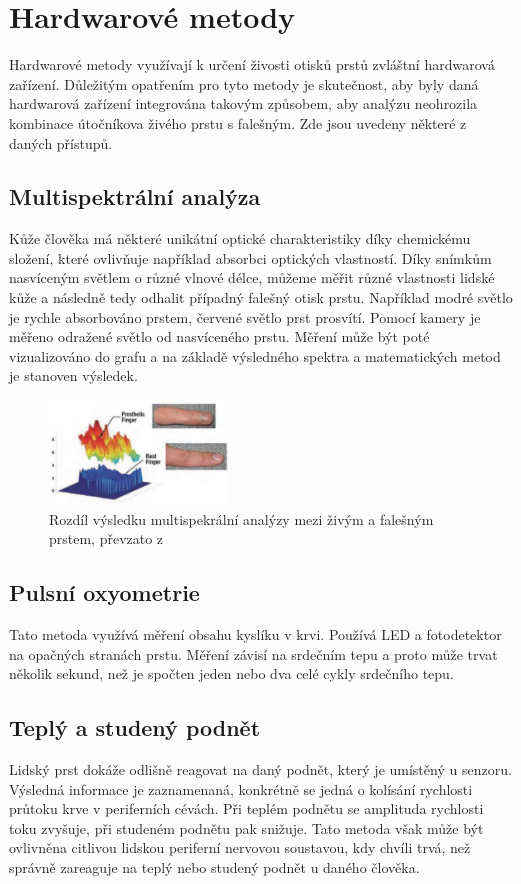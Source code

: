 \section{Hardwarové metody}
Hardwarové metody využívají k určení živosti otisků prstů zvláštní hardwarová zařízení. Důležitým opatřením pro tyto metody je skutečnost, aby byly daná hardwarová zařízení integrována takovým způsobem, aby analýzu neohrozila kombinace útočníkova živého prstu s falešným. Zde jsou uvedeny některé z daných přístupů.
\subsection{Multispektrální analýza}
Kůže člověka má některé unikátní optické charakteristiky díky chemickému složení, které ovlivňuje například absorbci optických vlastností. Díky snímkům nasvíceným světlem o různé vlnové délce, můžeme měřit různé vlastnosti lidské kůže a následně tedy odhalit případný falešný otisk prstu. Například modré světlo je rychle absorbováno prstem, červené světlo prst prosvítí. Pomocí kamery je měřeno odražené světlo od nasvíceného prstu. Měření může být poté vizualizováno do grafu a na základě výsledného spektra a matematických metod je stanoven výsledek. \cite{AdvancedBiometricsTechnologies2011}

\begin{figure}[!htbp]
    \centering
    \includegraphics[width=180px]{obrazky-figures/multispectralAnalysis.PNG}
    \caption{Rozdíl výsledku multispekrální analýzy mezi živým a falešným prstem, převzato z \cite{AdvancedBiometricsTechnologies2011}}
\end{figure}

\subsection{Pulsní oxyometrie}
Tato metoda využívá měření obsahu kyslíku v krvi. Používá LED a fotodetektor na opačných stranách prstu. Měření závisí na srdečním tepu a proto může trvat několik sekund, než je spočten jeden nebo dva celé cykly srdečního tepu. \cite{BiometricsEncyclopedia2009}
\subsection{Teplý a studený podnět}
Lidský prst dokáže odlišně reagovat na daný podnět, který je umístěný u senzoru. Výsledná informace je zaznamenaná, konkrétně se jedná o kolísání rychlosti průtoku krve v periferních cévách. Při teplém podnětu se amplituda rychlosti toku zvyšuje, při studeném podnětu pak snižuje. Tato metoda však může být ovlivněna citlivou lidskou periferní nervovou soustavou, kdy chvíli trvá, než správně zareaguje na teplý nebo studený podnět u daného člověka. \cite{AdvancedBiometricsTechnologies2011}
